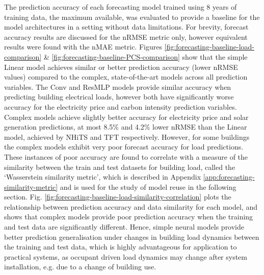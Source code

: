 The prediction accuracy of each forecasting model trained using 8 years of training data, the maximum available, was evaluated to provide a baseline for the model architectures in a setting without data limitations. For brevity, forecast accuracy results are discussed for the nRMSE metric only, however equivalent results were found with the nMAE metric. Figures \ref{fig:forecasting-baseline-load-comparison} \& \ref{fig:forecasting-baseline-PCS-comparison} show that the simple Linear model achieves similar or better prediction accuracy (lower nRMSE values) compared to the complex, state-of-the-art models across all prediction variables. The Conv and ResMLP models provide similar accuracy when predicting building electrical loads, however both have significantly worse accuracy for the electricity price and carbon intensity prediction variables. Complex models achieve slightly better accuracy for electricity price and solar generation predictions, at most 8.5\% and 4.2\% lower nRMSE than the Linear model, achieved by NHiTS and TFT respectively. However, for some buildings the complex models exhibit very poor forecast accuracy for load predictions. These instances of poor accuracy are found to correlate with a measure of the similarity between the train and test datasets for building load, called the `Wasserstein similarity metric', which is described in Appendix \ref{app:forecasting-similarity-metric} and is used for the study of model reuse in the following section. Fig. \ref{fig:forecasting-baseline-load-similarity-correlation} plots the relationship between prediction accuracy and data similarity for each model, and shows that complex models provide poor prediction accuracy when the training and test data are significantly different. Hence, simple neural models provide better prediction generalisation under changes in building load dynamics between the training and test data, which is highly advantageous for application to practical systems, as occupant driven load dynamics may change after system installation, e.g. due to a change of building use.

